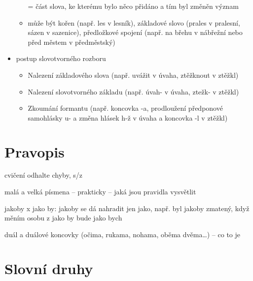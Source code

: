 \documentclass{memoir}
\begin{document}
\begin{itemize}
	\begin{itemize}
		\item[=] část slova, ke kterému bylo něco přidáno a tím byl změněn význam
		\item může být kořen (např. les v lesník), základové slovo (prales v pralesní, sázen v sazenice), předložkové spojení (např. na břehu v nábřežní nebo před městem v předměstský)
	\end{itemize}
	\item postup slovotvorného rozboru
	\begin{itemize}
		\item Nalezení základového slova (např. uvážit v úvaha, ztěžknout v ztěžkl)
		\item Nalezení slovotvorného základu (např. úvah- v úvaha, ztežk- v ztěžkl)
		\item Zkoumání formantu (např. koncovka -a, prodloužení předponové samohlásky u- a změna hlásek h-ž v úvaha a koncovka -l v ztěžkl)
	\end{itemize}
\end{itemize}

\section*{Pravopis}
cvičení odhalte chyby, s/z

malá a velká písmena – prakticky – jaká jsou pravidla vysvětlit

jakoby x jako by: jakoby se dá nahradit jen jako, např. byl jakoby zmatený, když měním osobu z jako by bude jako bych

duál a duálové koncovky (očima, rukama, nohama, oběma dvěma…) – co to je


\section*{Slovní druhy}
\end{document}
